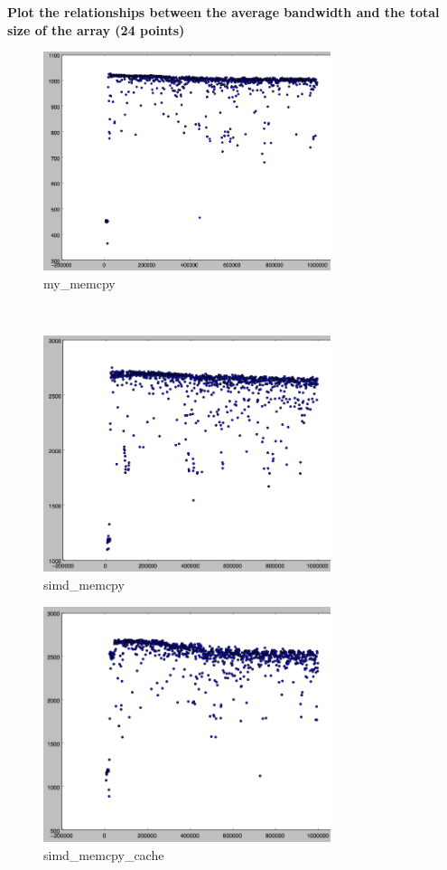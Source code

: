 \documentclass{article}
\begin{document}
\textbf{Plot the relationships between the average bandwidth and the total size of the array (24 points)}
\begin{figure}[!htbp]
  \caption{my\_memcpy}
  \centering
    \includegraphics[width=0.75\textwidth]{my_memcpy}
\end{figure}\\

\begin{figure}[!htbp]
  \caption{simd\_memcpy}
  \centering
    \includegraphics[width=0.75\textwidth]{simd_memcpy}
\end{figure}

\begin{figure}[!htbp]
  \caption{simd\_memcpy\_cache}
  \centering
    \includegraphics[width=0.75\textwidth]{simd_memcpy_cache}
\end{figure}
\end{document}
